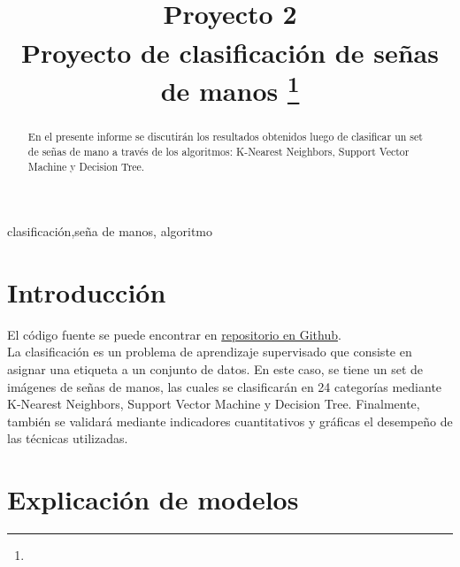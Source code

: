 \documentclass[conference]{IEEEtran}
\begin{document}
\title{Proyecto 2\\
{\footnotesize \textsuperscript{}Proyecto de clasificación de señas de manos}
\thanks{}
}

\author{
\and
{}
}

\maketitle

\begin{abstract}
En el presente informe se discutirán los resultados obtenidos luego de clasificar un set de señas de mano a través de los algoritmos:
K-Nearest Neighbors, Support Vector Machine y Decision Tree.
\end{abstract}

\begin{IEEEkeywords}
clasificación,seña de manos, algoritmo
\end{IEEEkeywords}

\section{Introducción}
El código fuente se puede encontrar en \href{https://github.com/morphisjustfun/proyecto_2_AI}{repositorio en Github}. \\
La clasificación es un problema de aprendizaje supervisado que consiste en asignar una etiqueta a un conjunto de datos.
En este caso, se tiene un set de imágenes de señas de manos, las cuales se clasificarán en 24 categorías mediante K-Nearest Neighbors,
Support Vector Machine y Decision Tree. Finalmente, también se validará mediante indicadores cuantitativos y gráficas el desempeño de las técnicas utilizadas.

\section{Explicación de modelos}
\end{document}
